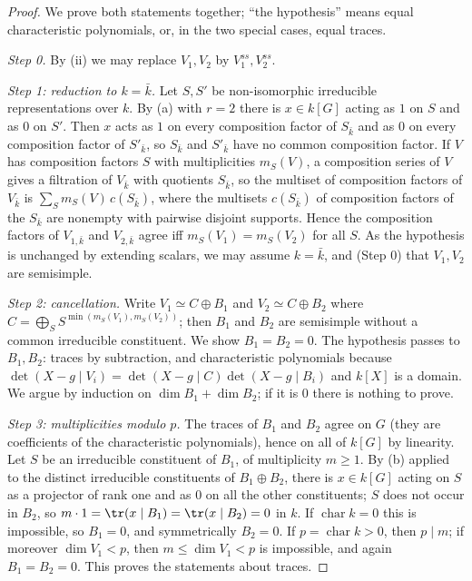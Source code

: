 \begin{proof}
We prove both statements together; ``the hypothesis'' means equal characteristic polynomials, or, in the two special cases, equal
traces.

\emph{Step 0.} By (ii) we may replace $V_1,V_2$ by $V_1^{ss},V_2^{ss}$.

\emph{Step 1: reduction to $k=\bar k$.} Let $S,S'$ be non-isomorphic irreducible representations over $k$. By (a) with
$r=2$ there is $x\in k[G]$ acting as $1$ on $S$ and as $0$ on $S'$. Then $x$ acts as $1$ on every composition factor of $S_{\bar k}$ and as $0$
on every composition factor of $S'_{\bar k}$, so $S_{\bar k}$ and $S'_{\bar k}$ have no common composition factor. If $V$ has composition factors $S$ with
multiplicities $m_S(V)$, a composition series of $V$ gives a filtration of $V_{\bar k}$ with quotients $S_{\bar k}$, so the multiset of composition
factors of $V_{\bar k}$ is $\sum_Sm_S(V)\,c(S_{\bar k})$, where the multisets $c(S_{\bar k})$ of composition factors of the $S_{\bar k}$ are nonempty with pairwise
disjoint supports. Hence the composition factors of $V_{1,\bar k}$ and $V_{2,\bar k}$ agree iff $m_S(V_1)=m_S(V_2)$ for all $S$. As the hypothesis is
unchanged by extending scalars, we may assume $k=\bar k$, and (Step 0) that $V_1,V_2$ are semisimple.

\emph{Step 2: cancellation.} Write $V_1\simeq C\oplus B_1$ and $V_2\simeq C\oplus B_2$ where $C=\bigoplus_SS^{\min(m_S(V_1),m_S(V_2))}$; then $B_1$ and $B_2$ are
semisimple without a common irreducible constituent. We show $B_1=B_2=0$. The hypothesis passes to $B_1,B_2$: traces by subtraction,
and characteristic polynomials because $\det(X-g\mid V_i)=\det(X-g\mid C)\det(X-g\mid B_i)$ and $k[X]$ is a domain. We argue by induction on
$\dim B_1+\dim B_2$; if it is $0$ there is nothing to prove.

\emph{Step 3: multiplicities modulo $p$.} The traces of $B_1$ and $B_2$ agree on $G$ (they are coefficients of the characteristic
polynomials), hence on all of $k[G]$ by linearity. Let $S$ be an irreducible constituent of $B_1$, of multiplicity $m\ge1$. By
(b) applied to the distinct irreducible constituents of $B_1\oplus B_2$, there is $x\in k[G]$ acting on $S$ as a projector of
rank one and as $0$ on all the other constituents; $S$ does not occur in $B_2$, so $m\cdot1=\tr(x\mid B_1)=\tr(x\mid B_2)=0$ in $k$. If
$\operatorname{char}k=0$ this is impossible, so $B_1=0$, and symmetrically $B_2=0$. If $p=\operatorname{char}k>0$, then $p\mid m$; if moreover
$\dim V_1<p$, then $m\le\dim V_1<p$ is impossible, and again $B_1=B_2=0$. This proves the statements about traces.


\end{proof}
